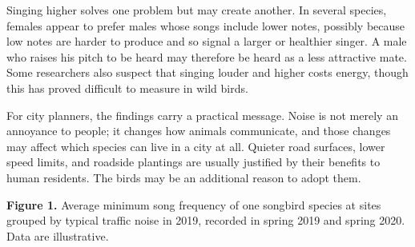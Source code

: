 \documentclass[11pt]{article}
\begin{document}
\begin{passage}
Singing higher solves one problem but may create another. In several species, females appear to prefer males whose songs include lower notes, possibly because low notes are harder to produce and so signal a larger or healthier singer. A male who raises his pitch to be heard may therefore be heard as a less attractive mate. Some researchers also suspect that singing louder and higher costs energy, though this has proved difficult to measure in wild birds.

For city planners, the findings carry a practical message. Noise is not merely an annoyance to people; it changes how animals communicate, and those changes may affect which species can live in a city at all. Quieter road surfaces, lower speed limits, and roadside plantings are usually justified by their benefits to human residents. The birds may be an additional reason to adopt them.
\end{passage}

\begin{center}
\par\vspace{2pt}
{\small\textbf{Figure 1.} Average minimum song frequency of one songbird species at sites grouped by typical traffic noise in 2019, recorded in spring 2019 and spring 2020. Data are illustrative.}
\end{center}
\end{document}
